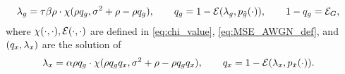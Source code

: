 \documentclass[12pt, draftclsnofoot,journal,onecolumn]{IEEEtran}
\begin{document}
\begin{align}
    \lambda_{g}=\tau&\beta\rho\cdot\chi(\rho q_{ g},\sigma_{}^2+\rho-\rho q_{ g}),\qquad
    q_{ g}=1-\mathcal{E}(\lambda_{g},p_{\tilde{g}}(\cdot)), \qquad 1-q_{ g} = {\mathcal{E}}_{G},
\label{eq:qh_qhtilde_solu_A&mse_G_vs_qh}
\end{align}
where $\chi(\cdot,\cdot), \mathcal{E}(\cdot,\cdot)$ are defined in \eqref{eq:chi_value}, \eqref{eq:MSE_AWGN_def}, and $(q_{ x},\lambda_x)$ are the solution of
\begin{align}
    \lambda_x=\alpha\rho q_{ g}&\cdot\chi({\rho q_{ g}q_{ x}},\sigma_{}^2+\rho-\rho q_{ g}q_{ x}), \qquad q_{ x}=1-\mathcal{E}(\lambda_x,p_{\tilde{x}}(\cdot)).
\label{eq:qx_qxtilde_solu_A}
\end{align}
\end{document}
